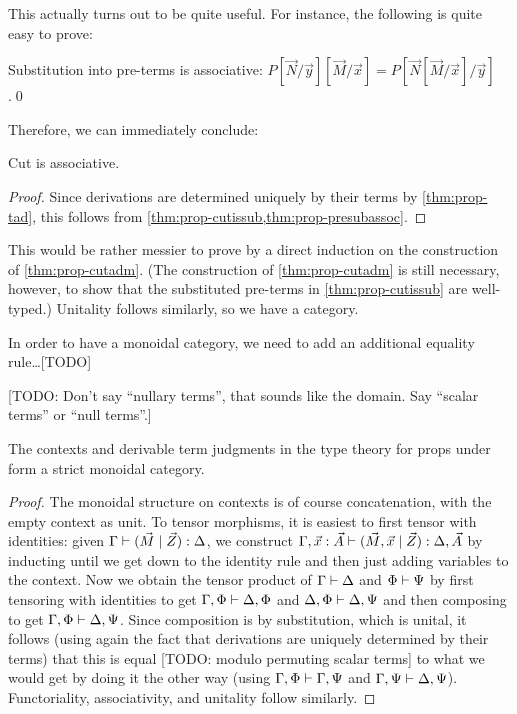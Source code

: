\begin{props}
This actually turns out to be quite useful.
For instance, the following is quite easy to prove:

\begin{lem}\label{thm:prop-presubassoc}
  Substitution into pre-terms is associative: $P[\vec N/\vec y][\vec M/\vec x] = P[\vec N[\vec M/\vec x]/\vec y]$.\qed
\end{lem}

Therefore, we can immediately conclude:

\begin{thm}\label{thm:prop-cutassoc}
  Cut is associative.
\end{thm}
\begin{proof}
  Since derivations are determined uniquely by their terms by \cref{thm:prop-tad}, this follows from \cref{thm:prop-cutissub,thm:prop-presubassoc}.
\end{proof}

This would be rather messier to prove by a direct induction on the construction of \cref{thm:prop-cutadm}.
(The construction of \cref{thm:prop-cutadm} is still necessary, however, to show that the substituted pre-terms in \cref{thm:prop-cutissub} are well-typed.)
Unitality follows similarly, so we have a category.

In order to have a monoidal category, we need to add an additional equality rule\dots [TODO]

[TODO: Don't say ``nullary terms'', that sounds like the domain.  Say ``scalar terms'' or ``null terms''.]

\begin{thm}\label{thm:prop-moncat}
  The contexts and derivable term judgments in the type theory for props under \cG form a strict monoidal category.
\end{thm}
\begin{proof}
  The monoidal structure on contexts is of course concatenation, with the empty context as unit.
  To tensor morphisms, it is easiest to first tensor with identities: given $\Gamma\vdash (\vec M\mid \vec Z):\Delta$, we construct $\Gamma,\vec x:\vec A\vdash (\vec M,\vec x\mid \vec Z):\Delta,\vec A$ by inducting until we get down to the identity rule and then just adding variables to the context.
  Now we obtain the tensor product of $\Gamma\vdash \Delta$ and $\Phi\vdash \Psi$ by first tensoring with identities to get $\Gamma,\Phi \vdash \Delta,\Phi$ and $\Delta,\Phi\vdash \Delta,\Psi$ and then composing to get $\Gamma,\Phi\vdash \Delta,\Psi$.
  Since composition is by substitution, which is unital, it follows (using again the fact that derivations are uniquely determined by their terms) that this is equal [TODO: modulo permuting scalar terms] to what we would get by doing it the other way (using $\Gamma,\Phi\vdash \Gamma,\Psi$ and $\Gamma,\Psi\vdash \Delta,\Psi$).
  Functoriality, associativity, and unitality follow similarly.
\end{proof}



\end{props}
